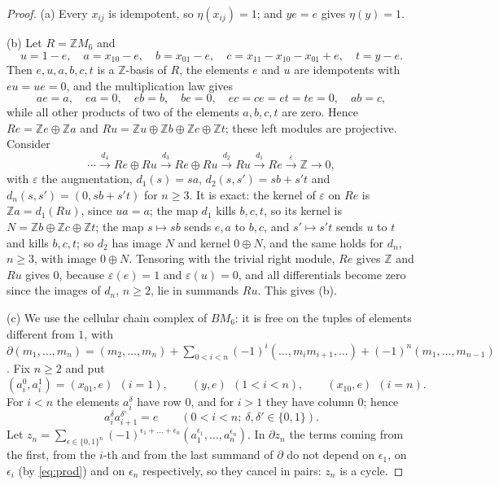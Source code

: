 \documentclass[11pt,a4paper]{article}
\theoremstyle{definition}
\newcommand{\Z}{\mathbb{Z}}
\begin{document}
\begin{proof}
(a) Every $x_{ij}$ is idempotent, so $\eta(x_{ij})=1$; and $ye=e$ gives
$\eta(y)=1$.

(b) Let $R=\Z M_6$ and
\[
 u=1-e,\quad a=x_{10}-e,\quad b=x_{01}-e,\quad
 c=x_{11}-x_{10}-x_{01}+e,\quad t=y-e .
\]
Then $e,u,a,b,c,t$ is a $\Z$-basis of $R$, the elements $e$ and $u$ are
idempotents with $eu=ue=0$, and the multiplication law gives
\[
 ae=a,\quad ea=0,\quad eb=b,\quad be=0,\quad ec=ce=et=te=0,\quad ab=c,
\]
while all other products of two of the elements $a,b,c,t$ are zero. Hence
$Re=\Z e\oplus\Z a$ and $Ru=\Z u\oplus\Z b\oplus\Z c\oplus\Z t$; these left
modules are projective. Consider
\[
 \cdots\xrightarrow{d_4}Re\oplus Ru\xrightarrow{d_3}Re\oplus Ru
 \xrightarrow{d_2}Ru\xrightarrow{d_1}Re\xrightarrow{\varepsilon}\Z\to0,
\]
with $\varepsilon$ the augmentation, $d_1(s)=sa$, $d_2(s,s')=sb+s't$ and
$d_n(s,s')=(0,sb+s't)$ for $n\ge3$. It is exact: the kernel of $\varepsilon$
on $Re$ is $\Z a=d_1(Ru)$, since $ua=a$; the map $d_1$ kills $b,c,t$, so its
kernel is $N=\Z b\oplus\Z c\oplus\Z t$; the map $s\mapsto sb$ sends $e,a$ to
$b,c$, and $s'\mapsto s't$ sends $u$ to $t$ and kills $b,c,t$; so $d_2$ has
image $N$ and kernel $0\oplus N$, and the same holds for $d_n$, $n\ge3$,
with image $0\oplus N$. Tensoring with the trivial right module, $Re$ gives
$\Z$ and $Ru$ gives $0$, because $\varepsilon(e)=1$ and $\varepsilon(u)=0$,
and all differentials become zero since the images of $d_n$, $n\ge2$, lie in
summands $Ru$. This gives (b).

(c) We use the cellular chain complex of $BM_6$: it is free on the tuples of
elements different from $1$, with
$\partial(m_1,\dots,m_n)=(m_2,\dots,m_n)
+\sum_{0<i<n}(-1)^i(\dots,m_im_{i+1},\dots)+(-1)^n(m_1,\dots,m_{n-1})$.
Fix $n\ge2$ and put
\[
 (a_i^0,a_i^1)=(x_{01},e)\ \ (i=1),\qquad(y,e)\ \ (1<i<n),\qquad
 (x_{10},e)\ \ (i=n).
\]
For $i<n$ the elements $a_i^\delta$ have row $0$, and for $i>1$ they have
column $0$; hence
\begin{equation}\label{eq:prod}
 a_i^{\delta}a_{i+1}^{\delta'}=e\qquad(0<i<n;\ \delta,\delta'\in\{0,1\}).
\end{equation}
Let $z_n=\sum_{\epsilon\in\{0,1\}^n}(-1)^{\epsilon_1+\dots+\epsilon_n}
(a_1^{\epsilon_1},\dots,a_n^{\epsilon_n})$. In $\partial z_n$ the terms
coming from the first, from the $i$-th and from the last summand of
$\partial$ do not depend on $\epsilon_1$, on $\epsilon_i$ (by
\eqref{eq:prod}) and on $\epsilon_n$ respectively, so they cancel in pairs:
$z_n$ is a cycle.


\end{proof}
\end{document}
